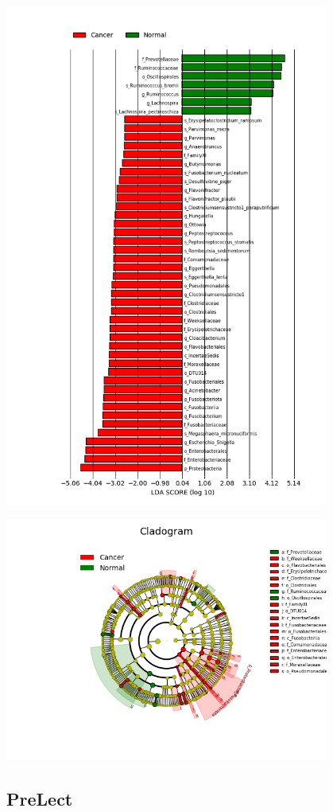 \documentclass[
]{article}
\begin{document}
\includegraphics[width=0.8\textwidth,height=\textheight]{images/Fig9.png}

\includegraphics[width=0.8\textwidth,height=\textheight]{images/Fig10.png}

\hypertarget{prelect}{%
\subsection{PreLect}\label{prelect}}
\end{document}

